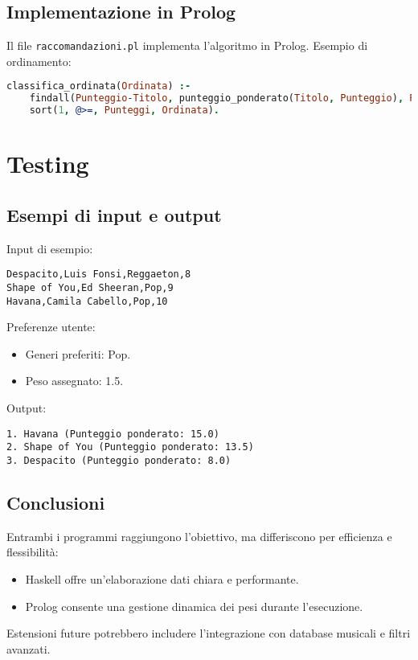 \documentclass[a4paper,11pt]{article}
\begin{document}
\subsection{Implementazione in Prolog}
Il file \texttt{raccomandazioni.pl} implementa l'algoritmo in Prolog. Esempio di ordinamento:
\begin{lstlisting}[language=Prolog,caption=Ordinamento delle canzoni]
classifica_ordinata(Ordinata) :-
    findall(Punteggio-Titolo, punteggio_ponderato(Titolo, Punteggio), Punteggi),
    sort(1, @>=, Punteggi, Ordinata).
\end{lstlisting}


\newpage
\section{Testing}
\subsection{Esempi di input e output}
Input di esempio:
\begin{verbatim}
Despacito,Luis Fonsi,Reggaeton,8
Shape of You,Ed Sheeran,Pop,9
Havana,Camila Cabello,Pop,10
\end{verbatim}
Preferenze utente:
\begin{itemize}
    \item Generi preferiti: Pop.
    \item Peso assegnato: 1.5.
\end{itemize}
Output:
\begin{verbatim}
1. Havana (Punteggio ponderato: 15.0)
2. Shape of You (Punteggio ponderato: 13.5)
3. Despacito (Punteggio ponderato: 8.0)
\end{verbatim}

\subsection{Conclusioni}
Entrambi i programmi raggiungono l'obiettivo, ma differiscono per efficienza e flessibilità:
\begin{itemize}
    \item Haskell offre un'elaborazione dati chiara e performante.
    \item Prolog consente una gestione dinamica dei pesi durante l'esecuzione.
\end{itemize}
Estensioni future potrebbero includere l'integrazione con database musicali e filtri avanzati.
\end{document}
